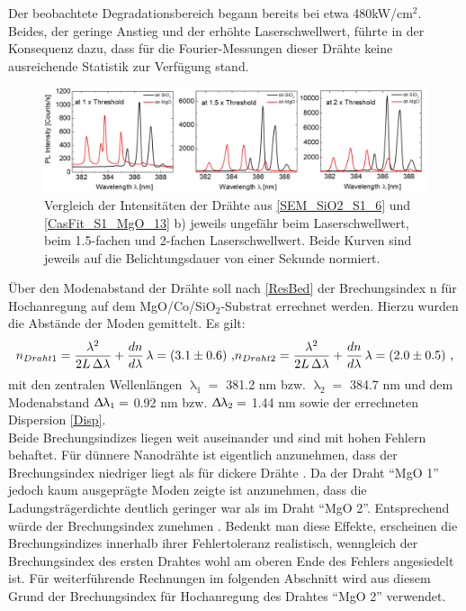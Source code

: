 Der beobachtete Degradationsbereich begann bereits bei etwa 480kW/cm$^\text{2}$. Beides, der geringe Anstieg und der erhöhte Laserschwellwert, führte in der Konsequenz dazu, dass für die Fourier-Messungen dieser Drähte keine ausreichende Statistik zur Verfügung stand.\begin{figure}[b]
\centering
\includegraphics[width=1\textwidth]{Bilder/MgO/Spec_MgO}
\caption{Vergleich der Intensitäten der Drähte aus \autoref{SEM_SiO2_S1_6} und \autoref{CasFit_S1_MgO_13} b) jeweils ungefähr beim Laserschwellwert, beim 1.5-fachen und 2-fachen Laserschwellwert. Beide Kurven sind jeweils auf die Belichtungsdauer von einer Sekunde normiert.}
\label{Spec_MgO} 
\end{figure}Über den Modenabstand der Drähte soll nach \autoref{ResBed}  der Brechungsindex n für Hochanregung auf dem MgO/Co/SiO$_\text{2}$-Substrat errechnet werden. Hierzu wurden die Abstände der Moden gemittelt. Es gilt:
\begin{equation}
n_{Draht 1} =\frac{\lambda^2}{2L\, \Delta\lambda} + \frac{dn}{d\lambda}\, \lambda= (3.1 \pm 0.6) \text{ ,}\\
n_{Draht 2} =\frac{\lambda^2}{2L\, \Delta\lambda} + \frac{dn}{d\lambda}\, \lambda= (2.0 \pm 0.5) \text{ ,}
\label{RefIndex}
\end{equation}
mit den zentralen Wellenlängen $\uplambda_\text{1}=$ 381.2 nm bzw. $\uplambda_\text{2}=$ 384.7 nm und dem Modenabstand $\Updelta\uplambda_\text{1}=$ 0.92 nm bzw. $\Updelta\uplambda_\text{2}=$ 1.44 nm sowie der errechneten Dispersion \autoref{Disp}.\\
Beide Brechungsindizes liegen weit auseinander und sind mit hohen Fehlern behaftet. Für dünnere Nanodrähte ist eigentlich anzunehmen, dass der Brechungsindex niedriger liegt als für dickere Drähte \cite{Zimmler.2010}. Da der Draht ``MgO 1'' jedoch kaum ausgeprägte Moden zeigte ist anzunehmen, dass die Ladungsträgerdichte deutlich geringer war als im Draht ``MgO 2''. Entsprechend würde der Brechungsindex zunehmen \cite{Wille.2016}. Bedenkt man diese Effekte, erscheinen die Brechungsindizes innerhalb ihrer Fehlertoleranz realistisch, wenngleich der Brechungsindex des ersten Drahtes wohl am oberen Ende des Fehlers angesiedelt ist. Für weiterführende Rechnungen im folgenden Abschnitt wird aus diesem Grund der Brechungsindex für Hochanregung des Drahtes ``MgO 2''  verwendet.
